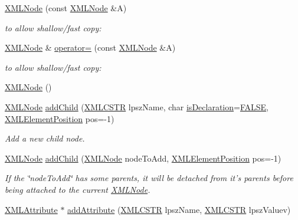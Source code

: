\begin{DoxyCompactItemize}
\hyperlink{structXMLNode_a138099a1355b9d4103c239d9042adad3}{X\-M\-L\-Node} (const \hyperlink{structXMLNode}{X\-M\-L\-Node} \&A)
\begin{DoxyCompactList}\small\item\em to allow shallow/fast copy\-: \end{DoxyCompactList}\item 
\hyperlink{structXMLNode}{X\-M\-L\-Node} \& \hyperlink{structXMLNode_a8154edc759dc934043803de2521c056c}{operator=} (const \hyperlink{structXMLNode}{X\-M\-L\-Node} \&A)
\begin{DoxyCompactList}\small\item\em to allow shallow/fast copy\-: \end{DoxyCompactList}\item 
\hyperlink{structXMLNode_a719b115adfb642594107854189559ff2}{X\-M\-L\-Node} ()
\item 
\hyperlink{structXMLNode}{X\-M\-L\-Node} \hyperlink{group__creation_ga51baa56a48f69cdea6f41ed38a2cbadd}{add\-Child} (\hyperlink{xmlParser_8h_acdb0d6fd8dd596384b438d86cfb2b182}{X\-M\-L\-C\-S\-T\-R} lpsz\-Name, char \hyperlink{group__navigate_ga71df27d54a2dc09b0a456406a7e8c6d3}{is\-Declaration}=\hyperlink{xmlParser_8h_aa93f0eb578d23995850d61f7d61c55c1}{F\-A\-L\-S\-E}, \hyperlink{xmlParser_8h_aab10d65aadeca1f026f6416becde7432}{X\-M\-L\-Element\-Position} pos=-\/1)
\begin{DoxyCompactList}\small\item\em Add a new child node. \end{DoxyCompactList}\item 
\hyperlink{structXMLNode}{X\-M\-L\-Node} \hyperlink{group__creation_ga37c862f1d4a86f95417f97ceaa40d0fa}{add\-Child} (\hyperlink{structXMLNode}{X\-M\-L\-Node} node\-To\-Add, \hyperlink{xmlParser_8h_aab10d65aadeca1f026f6416becde7432}{X\-M\-L\-Element\-Position} pos=-\/1)
\begin{DoxyCompactList}\small\item\em If the \char`\"{}node\-To\-Add\char`\"{} has some parents, it will be detached from it's parents before being attached to the current \hyperlink{structXMLNode}{X\-M\-L\-Node}. \end{DoxyCompactList}\item 
\hyperlink{structXMLAttribute}{X\-M\-L\-Attribute} $\ast$ \hyperlink{group__creation_ga4f0e996a36cdda88b76bdf49d0d2e50c}{add\-Attribute} (\hyperlink{xmlParser_8h_acdb0d6fd8dd596384b438d86cfb2b182}{X\-M\-L\-C\-S\-T\-R} lpsz\-Name, \hyperlink{xmlParser_8h_acdb0d6fd8dd596384b438d86cfb2b182}{X\-M\-L\-C\-S\-T\-R} lpsz\-Valuev)

\end{DoxyCompactItemize}
